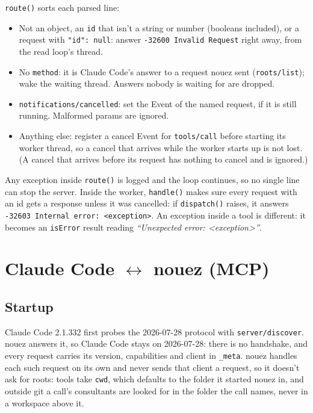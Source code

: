 \documentclass[10pt,a4paper]{article}
\newcommand{\code}[1]{\texttt{#1}}
\begin{document}
\code{route()} sorts each parsed line:

\begin{itemize}
  \item Not an object, an \code{id} that isn't a string or number (booleans included), or a
        request with \code{"id": null}: answer \code{-32600 Invalid Request} right away, from the
        read loop's thread.
  \item No \code{method}: it is Claude Code's answer to a request nouez sent (\code{roots/list}); wake the waiting thread. Answers nobody is waiting for are dropped.
  \item \code{notifications/cancelled}: set the Event of the named request, if it is still running. Malformed params are ignored.
  \item Anything else: register a cancel Event for \code{tools/call} before starting its worker
        thread, so a cancel that arrives while the worker starts up is not lost. (A cancel that
        arrives before its request has nothing to cancel and is ignored.)
\end{itemize}

Any exception inside \code{route()} is logged and the loop continues, so no single line can stop
the server. Inside the worker, \code{handle()} makes sure every request with an id gets a
response unless it was cancelled: if \code{dispatch()} raises, it answers
\code{-32603 Internal error: <exception>}. An exception inside a tool is different: it becomes an
\code{isError} result reading \emph{``Unexpected error: <exception>''}.

\section{Claude Code \texorpdfstring{$\leftrightarrow$}{<->} nouez (MCP)}
\label{sec:mcp}

\subsection{Startup}

Claude Code 2.1.332 first probes the 2026-07-28 protocol with \code{server/discover}. nouez
answers it, so Claude Code stays on 2026-07-28: there is no handshake, and every request carries
its version, capabilities and client in \code{\_meta}. nouez handles each such request on its own
and never sends that client a request, so it doesn't ask for roots: tools take \code{cwd}, which
defaults to the folder it started nouez in, and outside git a call's consultants are looked for in
the folder the call names, never in a workspace above it.
\end{document}
